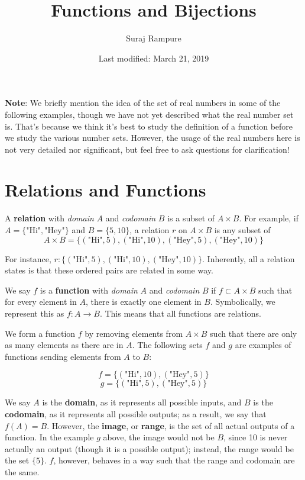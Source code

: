\documentclass{article}
\title{Functions and Bijections}
\author{Suraj Rampure}
\date{Last modified: March 21, 2019}
\begin{document}
\maketitle

\begin{center}
\textbf{Note}: We briefly mention the idea of the set of real numbers in some of the following examples, though we have not yet described what the real number set is. That's because we think it's best to study the definition of a function before we study the various number sets. However, the usage of the real numbers here is not very detailed nor significant, but feel free to ask questions for clarification!
\end{center}

\section{Relations and Functions}

A \textbf{relation} with \textit{domain} $A$ and \textit{codomain} $B$ is a subset of $A \times B$. For example, if $A = \{ \text{"Hi"}, \text{"Hey"}\}$ and $B = \{5, 10\}$, a relation $r$ on $A \times B$ is any subset of
\[A \times B = \{ (\text{"Hi"}, 5), (\text{"Hi"}, 10), (\text{"Hey"}, 5), (\text{"Hey"}, 10) \}\]

For instance, $r: \{ (\text{"Hi"}, 5), (\text{"Hi"}, 10), (\text{"Hey"}, 10) \}$. Inherently, all a relation states is that these ordered pairs are related in some way.

We say $f$ is a \textbf{function} with \textit{domain} $A$ and \textit{codomain} $B$ if $f \subset A \times B$ such that for every element in $A$, there is exactly one element in $B$. Symbolically, we represent this as $f : A \rightarrow B$. This means that all functions are relations.

We form a function $f$ by removing elements from $A \times B$ such that there are only as many elements as there are in $A$. The following sets $f$ and $g$ are examples of functions sending elements from $A$ to $B$:

\[f = \{ (\text{"Hi"}, 10), (\text{"Hey"}, 5) \}\]
\[g = \{ (\text{"Hi"}, 5), (\text{"Hey"}, 5) \}\]

We say $A$ is the \textbf{domain}, as it represents all possible inputs, and $B$ is the \textbf{codomain}, as it represents all possible outputs; as a result, we say that $f(A) = B$. However, the \textbf{image}, or \textbf{range}, is the set of all actual outputs of a function. In the example $g$ above, the image would not be $B$, since 10 is never actually an output (though it is a possible output); instead, the range would be the set $\{ 5 \}$. $f$, however, behaves in a way such that the range and codomain are the same.
\end{document}
